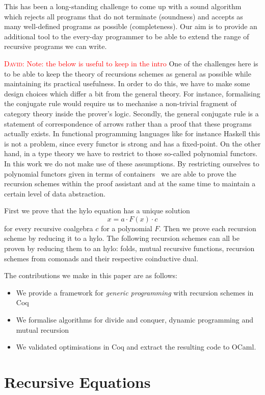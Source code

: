 \documentclass{article}
\newcommand{\dcas}[1]{\textcolor{red}{\textsc{David}: #1}}
\newcommand{\comp}{\cdot}
\begin{document}
This has been a long-standing challenge to come up with a sound algorithm which
rejects all programs that do not terminate (soundness) and accepts as many
well-defined programs as possible (completeness). Our aim is to provide an
additional tool to the every-day programmer to be able to extend the range of
recursive programs we can write.

\dcas{Note: the below is useful to keep in the intro}
One of the challenges here is to be able to keep the theory of recursions
schemes as general as possible while maintaining its practical usefulness. In
order to do this, we have to make some design choices which differ a bit from
the general theory.  For instance, formalising the conjugate rule would require
us to mechanise a non-trivial fragment of category theory inside the prover's
logic.  Secondly, the general conjugate rule is a statement of correspondence of
arrows rather than a proof that these programs actually exists. In functional
programming languages like for instance Haskell this is not a problem, since
every functor is strong and has a fixed-point.  On the other hand, in a type
theory we have to restrict to those so-called polynomial functors. In this work
we do not make use of these assumptions. By restricting ourselves to polynomial
functors given in terms of containers~\cite{AbbottAG05} we are able to prove the
recursion schemes within the proof assistant and at the same time to maintain a
certain level of data abstraction.

First we prove that the hylo equation has a unique solution
\[
  x = a \comp F(x) \comp c
\]
for every recursive coalgebra $c$ for a polynomial $F$. Then we prove each
recursion scheme by reducing it to a hylo. The following recursion schemes can
all be proven by reducing them to an hylo: folds, mutual recursive functions,
recursion schemes from comonads and their respective coinductive dual.

The contributions we make in this paper are as follows:
\begin{itemize}
  \item We provide a framework for \emph{generic programming} with recursion
schemes in Coq
  \item We formalise algorithms for divide and conquer, dynamic programming and
mutual recursion
  \item We validated optimisations in Coq and extract the resulting code to
OCaml.
\end{itemize}

\section{Recursive Equations}
\end{document}
